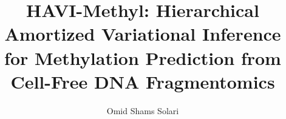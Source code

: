 \documentclass[11pt]{saim}
\title{HAVI-Methyl: Hierarchical Amortized Variational Inference\\for Methylation Prediction from Cell-Free DNA Fragmentomics}
\author[1]{Omid Shams Solari}
\affiliation[1]{sAIm Labs}
\begin{document}
\maketitle

\tableofcontents





















\beginappendix









\end{document}

